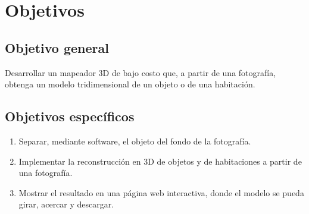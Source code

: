 \section{Objetivos}

\subsection{Objetivo general}

Desarrollar un mapeador 3D de bajo costo que, a partir de una fotografía, obtenga
un modelo tridimensional de un objeto o de una habitación.

\subsection{Objetivos específicos}

\begin{enumerate}
  \item Separar, mediante software, el objeto del fondo de la fotografía.
  \item Implementar la reconstrucción en 3D de objetos y de habitaciones a
        partir de una fotografía.
  \item Mostrar el resultado en una página web interactiva, donde el modelo se
        pueda girar, acercar y descargar.
\end{enumerate}
